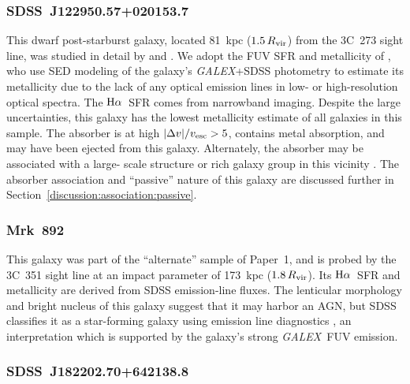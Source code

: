 \documentclass[twocolumn,twocolappendix,tighten,times]{aastex6}
\newcommand{\galex}{{\sl GALEX}}
\newcommand{\Ha}{\ensuremath{{\rm H}\alpha}}
\begin{document}
\subsubsection{SDSS~J122950.57+020153.7}
\label{indiv:galaxies:sdssj1229+02}

This dwarf post-starburst galaxy, located 81~kpc ($1.5\,R_{\rm vir}$) from the 
3C~273 sight line, was studied in detail by \citet{stocke04} and \citet{keeney14}.
We adopt the FUV SFR and metallicity of \citet{keeney14}, who use SED modeling of 
the galaxy's \galex+SDSS photometry to estimate its metallicity due to the lack 
of any optical emission lines in low- or high-resolution optical spectra. The 
\Ha\ SFR comes from narrowband imaging. Despite the large uncertainties, this galaxy 
has the lowest metallicity estimate of all galaxies in this sample. The absorber is 
at high $|\Delta v|/v_{\rm esc} > 5$, contains metal absorption, and may have been 
ejected from this galaxy. Alternately, the absorber may be associated with a large-
scale structure or rich galaxy group in this vicinity 
\citep{rosenberg03,yoon12,stocke14}. The absorber association and ``passive'' nature 
of this galaxy are discussed further in Section~\ref{discussion:association:passive}.


\subsubsection{Mrk~892}
\label{indiv:galaxies:mrk892}

This galaxy was part of the ``alternate'' sample of Paper~1, and is probed by 
the 3C~351 sight line at an impact parameter of 173~kpc ($1.8\,R_{\rm vir}$).
Its \Ha\ SFR and metallicity are derived from SDSS emission-line fluxes. The 
lenticular morphology and bright nucleus of this galaxy suggest that it may 
harbor an AGN, but SDSS classifies it as a star-forming galaxy 
using emission line diagnostics \citep{kewley06}, an interpretation which is 
supported by the galaxy's strong \galex\ FUV emission.


\subsubsection{SDSS~J182202.70+642138.8}
\label{indiv:galaxies:sdssj1822+64}
\end{document}
